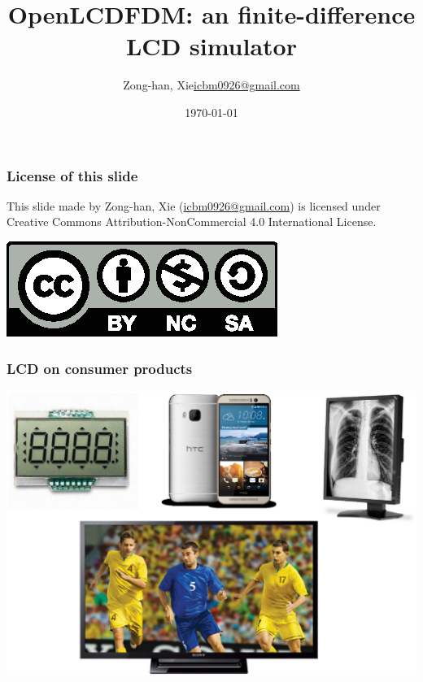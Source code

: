 \documentclass{beamer}
\title{OpenLCDFDM: an finite-difference LCD simulator}
\author{\texorpdfstring{Zong-han, Xie\newline\url{icbm0926@gmail.com}}{Zong-han, Xie}}
\date{\today}
\begin{document}
\begin{frame}
\titlepage
\end{frame}
\begin{frame}[label=licensepage]
\frametitle{License of this slide}
This slide made by Zong-han, Xie (\href{icbm0926@gmail.com}{icbm0926@gmail.com}) is licensed under Creative Commons Attribution-NonCommercial 4.0 International License. \newline
\begin{center}
\includegraphics[scale=1.0]{by-nc-sa.eps}
\end{center}
\end{frame}
\begin{frame}
\frametitle{LCD on consumer products}
\begin{center}
\includegraphics[scale=0.4]{LCD_Consumers.eps}
\end{center}
\end{frame}
\end{document}
